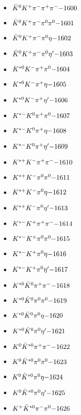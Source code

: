 \begin{multicols}{3}
\begin{itemize}
 \item $ \bar{K}^{0} K^{+} \pi^{-} \pi^{+} \pi^{-} \hfill{-1600}$
 \item $ \bar{K}^{0} K^{+} \pi^{-} \pi^{0} \pi^{0} \hfill{-1601}$
 \item $ \bar{K}^{0} K^{+} \pi^{-} \pi^{0} \eta \hfill{-1602}$
 \item $ \bar{K}^{0} K^{+} \pi^{-} \pi^{0} {\eta^{\prime}} \hfill{-1603}$
 \item $ K^{*0} K^{-} \pi^{+} \pi^{0} \hfill{-1604}$
 \item $ K^{*0} K^{-} \pi^{+} \eta \hfill{-1605}$
 \item $ K^{*0} K^{-} \pi^{+} {\eta^{\prime}} \hfill{-1606}$
 \item $ K^{*-} K^{0} \pi^{+} \pi^{0} \hfill{-1607}$
 \item $ K^{*-} K^{0} \pi^{+} \eta \hfill{-1608}$
 \item $ K^{*-} K^{0} \pi^{+} {\eta^{\prime}} \hfill{-1609}$
 \item $ K^{*+} K^{-} \pi^{+} \pi^{-} \hfill{-1610}$
 \item $ K^{*+} K^{-} \pi^{0} \pi^{0} \hfill{-1611}$
 \item $ K^{*+} K^{-} \pi^{0} \eta \hfill{-1612}$
 \item $ K^{*+} K^{-} \pi^{0} {\eta^{\prime}} \hfill{-1613}$
 \item $ K^{*-} K^{+} \pi^{+} \pi^{-} \hfill{-1614}$
 \item $ K^{*-} K^{+} \pi^{0} \pi^{0} \hfill{-1615}$
 \item $ K^{*-} K^{+} \pi^{0} \eta \hfill{-1616}$
 \item $ K^{*-} K^{+} \pi^{0} {\eta^{\prime}} \hfill{-1617}$
 \item $ K^{*0} \bar{K}^{0} \pi^{+} \pi^{-} \hfill{-1618}$
 \item $ K^{*0} \bar{K}^{0} \pi^{0} \pi^{0} \hfill{-1619}$
 \item $ K^{*0} \bar{K}^{0} \pi^{0} \eta \hfill{-1620}$
 \item $ K^{*0} \bar{K}^{0} \pi^{0} {\eta^{\prime}} \hfill{-1621}$
 \item $ K^{0} \bar{K}^{*0} \pi^{+} \pi^{-} \hfill{-1622}$
 \item $ K^{0} \bar{K}^{*0} \pi^{0} \pi^{0} \hfill{-1623}$
 \item $ K^{0} \bar{K}^{*0} \pi^{0} \eta \hfill{-1624}$
 \item $ K^{0} \bar{K}^{*0} \pi^{0} {\eta^{\prime}} \hfill{-1625}$
 \item $ K^{+} \bar{K}^{*0} \pi^{-} \pi^{0} \hfill{-1626}$

\end{itemize}
\end{multicols}
